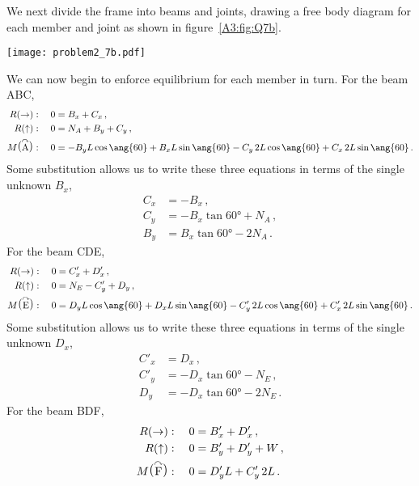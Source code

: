 \documentclass[a4paper,justified,oneside]{tufte-handout}
\numberwithin{equation}{subsection}
\begin{document}
\begin{solution}
We next divide the frame into beams and joints, drawing a free body diagram for each member and joint as shown in figure~\ref{A3:fig:Q7b}.
\begin{figure*}
	\centering
	\texttt{[image: problem2\_7b.pdf]}
	\caption{Free body diagrams for all three members of the frame and the joints.}
	\label{A3:fig:Q7b}
\end{figure*}
We can now begin to enforce equilibrium for each member in turn. For the beam ABC,
\begin{align*}
	R(\rightarrow):\quad	0	&=	B_x	+C_x	\,,	\\
	R(\uparrow):\quad		0	&=	N_A	+B_y	+C_y	\,,	\\
	M\raisebox{1.5pt}{\big(}\overset{\curvearrowright}{\text{A}}\raisebox{1.5pt}{\big)}:\quad 0	&=	-B_y L\cos\ang{60}	+B_x L\sin\ang{60}	-C_y \, 2L\cos\ang{60}	+C_x \, 2L\sin\ang{60}	\,.	\\
\end{align*}
Some substitution allows us to write these three equations in terms of the single unknown $B_x$,
\begin{align*}
	C_x	&=	-B_x	\,,\\
	C_y	&=	-B_x\tan\ang{60}	+N_A	\,,	\\
	B_y	&=	B_x\tan\ang{60}	-2N_A	\,.
\end{align*}
For the beam CDE,
\begin{align*}
	R(\rightarrow):\quad	0	&=	C'_x	+D'_x	\,,	\\
	R(\uparrow):\quad		0	&=	N_E	-C'_y	+D_y	\,,	\\
	M\raisebox{1.5pt}{\big(}\overset{\curvearrowright}{\text{E}}\raisebox{1.5pt}{\big)}:\quad 0	&=	D_y L\cos\ang{60}	+D_x L\sin\ang{60}	-C'_y \, 2L\cos\ang{60}	+C'_x \, 2L\sin\ang{60}	\,.	\\
\end{align*}
Some substitution allows us to write these three equations in terms of the single unknown $D_x$,
\begin{align*}
	C'_x	&=	D_x	\,,\\
	C'_y	&=	-D_x\tan\ang{60}	-N_E	\,,	\\
	D_y		&=	-D_x\tan\ang{60}	-2N_E	\,.
\end{align*}
For the beam BDF,
\begin{align*}
	R(\rightarrow):\quad	0	&=	B'_x	+D'_x	\,,	\\
	R(\uparrow):\quad		0	&=	B'_y	+D'_y	+W	\,,	\\
	M\raisebox{1.5pt}{\big(}\overset{\curvearrowright}{\text{F}}\raisebox{1.5pt}{\big)}:\quad 0	&=	D'_y L	+C'_y \, 2L\,.	\\

\end{align*}
\end{solution}
\end{document}
